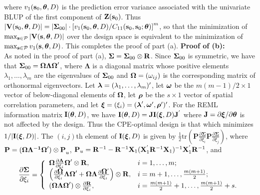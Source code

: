 \documentclass[12pt]{article}
\def\btheta{\mbox{\boldmath$\theta$}}
\def\bSigma{\mbox{\boldmath$\Sigma$}}
\def\bOmega{\mbox{\boldmath$\Omega$}}
\def\blambda{\mbox{\boldmath$\lambda$}}
\def\bomega{\mbox{\boldmath$\omega$}}
\def\brho{\mbox{\boldmath$\rho$}}
\def\bxi{\mbox{\boldmath$\xi$}}
\newcommand{\mb}[1]{\mbox{\boldmath$#1$}}
\begin{document}
where $v_1({\bf s}_0,\btheta,D)$ is the prediction error variance associated with the univariate BLUP of the first component of ${\bf Z}({\bf s}_0)$.  Thus
$|{\bf V}({\bf s}_0,\btheta,D)|=|\bSigma_{00}|\cdot\left[v_1({\bf s}_0,\btheta,D)/C_{11}({\bf s}_0,{\bf s}_0;\btheta)\right]^m$, so that the minimization of $\max_{{\bf s}\in{\cal P}}|{\bf V}({\bf s},\btheta,D)|$ over the design space is equivalent to the minimization of $\max_{{\bf s}\in{\cal P}}v_1({\bf s},\btheta,D)$.  This completes the proof of part (a).
\vspace{.2in}
\newline
\noindent\textbf{Proof of (b):}\\
As noted in the proof of part (a), $\bSigma=\bSigma_{00}\otimes{\bf R}$. Since $\bSigma_{00}$ is symmetric, we have that $\bSigma_{00}=\bOmega\mathbf{\Lambda}\bOmega'$, where $\mathbf{\Lambda}$ is a diagonal matrix whose positive elements $\lambda_{1},\ldots,\lambda_m$ are the eigenvalues of $\bSigma_{00}$ and
$\bOmega=(\omega_{ij})$ is the corresponding matrix of orthonormal eigenvectors.  Let $\blambda=(\lambda_1,\ldots,\lambda_m)'$, let $\bomega$ be the $m(m-1)/2\times 1$ vector of below-diagonal elements of $\bOmega$, let $\brho$ be the $s\times 1$ vector of spatial correlation parameters, and let
$\mb{\xi}=(\xi_{i})=(\blambda',\bomega',\brho')'$.  For the REML information matrix ${\bf I}(\btheta,D)$, we have ${\bf I}(\btheta,D)={\bf JI}(\bxi,D){\bf J}^{'}$ where ${\bf J}=\partial\bxi/\partial\btheta$ is not affected by the design.  Thus the CPE-optimal design is that which minimizes $1/|{\bf I}(\bxi,D)|$.  The $(i,j)$th element of ${\bf I}(\mb{\xi},D)$ is given by $\frac{1}{2}\text{tr}(\mathbf{P}\frac{\partial\mathbf{\Sigma}}{\partial\xi_{i}}\mathbf{P}\frac{\partial\mathbf{\Sigma}}{\partial\xi_{j}})$, where $\mathbf{P=(\bOmega
\mathbf{\Lambda}^{-1}\bOmega')\otimes P}_{u}$, $\mathbf{P}_{u}={\bf R}^{-1}-{\bf R}^{-1}{\bf X}_{1}({\bf X}^{'}_{1}{\bf R}^{-1}{\bf X}_{1})^{-1}{\bf X}^{'}_{1}{\bf R}^{-1}$, and
\[ \frac{\partial \mathbf{\Sigma}}{\partial \xi_{i}}=\left\{\begin{array}{ll}
\bOmega\frac{\partial\mathbf{\Lambda}}{\partial\xi_{i}}\bOmega'\otimes {\bf R}, & i=1,\ldots,m; \\
\left(\frac{\partial\bOmega}{\partial\xi_{i}}\mathbf{\Lambda}\bOmega'+
  \bOmega\mathbf{\Lambda}\frac{\partial\bOmega'}{\partial\xi_{i}}\right)\otimes {\bf R}, & i=m+1,\ldots,\frac{m(m+1)}{2}; \\
(\bOmega\mathbf{\Lambda}\bOmega')\otimes\frac{\partial {\bf R}}{\partial\xi_{i}}, & i=\frac{m(m+1)}{2}+1,\ldots,\frac{m(m+1)}{2}+s. \end{array} \right.
\]
\end{document}
